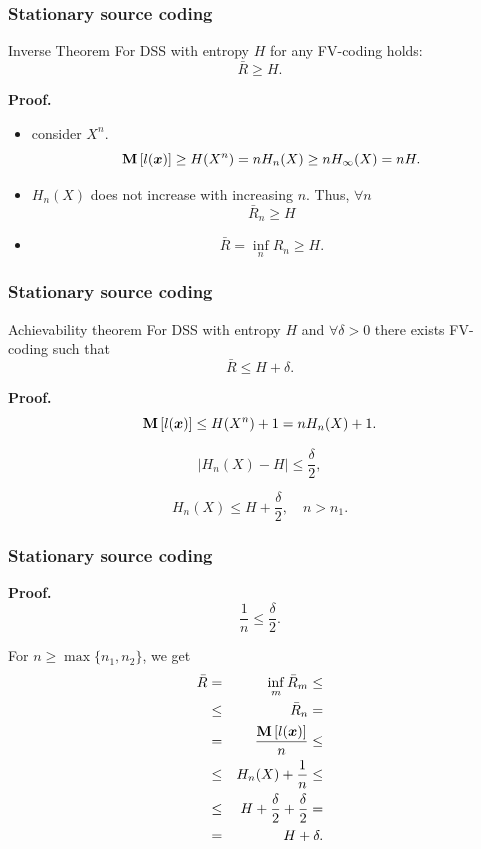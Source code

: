 \documentclass[14pt]{beamer}
\renewcommand{\vec}[1]{\ensuremath{\boldsymbol{#1}}}
\begin{document}
\begin{frame}
\frametitle{Stationary source coding}
\small{

    \begin{theorem} {Inverse Theorem} For DSS with entropy $H$ for any FV-coding holds:
    \[
    \bar {R} \ge H.
    \]
    \end{theorem}
    \textbf{Proof.}
    \begin{itemize}    
    \item consider $X^n$.
    \[
    {\rm {\bf M}}\left[ {l(\vec x)} \right] \ge H(X^n) = nH_n (X) \ge nH_\infty (X) = nH.
    \]
    \item $H_n (X)$ does not increase with increasing $n$. Thus, $\forall n$
    \[
    \bar {R}_n \ge H
    \]
    \item
    \[
    \bar {R} = \mathop {\inf }\limits_n R_n \ge H.
    \]
    \end{itemize}
}
\end{frame}


\begin{frame}
\frametitle{Stationary source coding}  
\small{

    \begin{theorem}{Achievability theorem} For DSS with entropy $H$ and $\forall \delta > 0$ there exists FV-coding such that
    \[
    \bar {R} \le H + \delta .
    \]
    \end{theorem}
   
    \textbf{Proof. }
    \begin{equation}
    \label{p2eq8} {\rm {\bf M}}\left[ {l(\vec x)} \right] \le H(X^n) + 1
    = nH_n (X) + 1.
    \end{equation}
    
    \[
    \left| {H_n (X) - H} \right| \le \frac{\delta }{2},
    \]
    
    \begin{equation}
    \label{p2eq9} H_n (X) \le H + \frac{\delta }{2}, \quad n > n_1 .
    \end{equation}
}
\end{frame}

\begin{frame}
\frametitle{Stationary source coding}  
\small{   
    \textbf{Proof. }
    \begin{equation}
    \label{p2eq10} \frac{1}{n} \le \frac{\delta }{2}.
    \end{equation}
    
    For $n \ge \max \{n_1 ,n_2 \}$, we get
    \begin{eqnarray*}
    \bar {R} &=& \mathop {\inf }\limits_m \bar {R}_m \le \\
    &\le& \bar {R}_n = \\
    &=& \frac{{\rm {\bf M}}\left[ {l(\vec x)} \right]}{n} \le \\
    &\le&  H_n (X) + \frac{1}{n} \le\\
    &\le& H + \frac{\delta }{2} + \frac{\delta }{2} =\\
    &=& H + \delta.
    \end{eqnarray*}
}
\end{frame}
\end{document}
